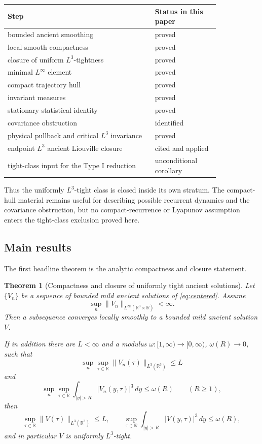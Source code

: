 \documentclass[11pt]{amsart}
\theoremstyle{plain}
\newtheorem{theorem}{Theorem}[section]
\theoremstyle{definition}
\theoremstyle{remark}
\numberwithin{equation}{section}
\newcommand{\R}{\mathbb R}
\begin{document}
\begin{center}
\small
\begin{tabular}{p{0.58\linewidth}p{0.25\linewidth}}
\hline
Step & Status in this paper\\
\hline
bounded ancient smoothing & proved\\
local smooth compactness & proved\\
closure of uniform \(L^3\)-tightness & proved\\
minimal \(L^\infty\) element & proved\\
compact trajectory hull & proved\\
invariant measures & proved\\
stationary statistical identity & proved\\
covariance obstruction & identified\\
physical pullback and critical \(L^3\) invariance & proved\\
endpoint \(L^3\) ancient Liouville closure & cited and applied\\
tight-class input for the Type I reduction & unconditional corollary\\
\hline
\end{tabular}
\end{center}

Thus the uniformly \(L^3\)-tight class is closed inside its own stratum.  The
compact-hull material remains useful for describing possible recurrent
dynamics and the covariance obstruction, but no compact-recurrence or
Lyapunov assumption enters the tight-class exclusion proved here.

\subsection{Main results}

The first headline theorem is the analytic compactness and closure statement.

\begin{theorem}[Compactness and closure of uniformly tight ancient solutions]
\label{thm:tight-compactness-intro}
Let \(\{V_n\}\) be a sequence of bounded mild ancient solutions of
\eqref{eq:centered}.  Assume
\[
   \sup_n\|V_n\|_{L^\infty(\R^3\times\R)}<\infty .
\]
Then a subsequence converges locally smoothly to a bounded mild ancient
solution \(V\).

If in addition there are \(L<\infty\) and a modulus
\(\omega:[1,\infty)\to[0,\infty)\), \(\omega(R)\to0\), such that
\[
   \sup_n\sup_{\tau\in\R}\|V_n(\tau)\|_{L^3(\R^3)}\le L
\]
and
\[
   \sup_n\sup_{\tau\in\R}
   \int_{|y|>R}|V_n(y,\tau)|^3\,dy\le \omega(R)
   \qquad (R\ge1),
\]
then
\[
   \sup_{\tau\in\R}\|V(\tau)\|_{L^3(\R^3)}\le L,
   \qquad
   \sup_{\tau\in\R}\int_{|y|>R}|V(y,\tau)|^3\,dy\le\omega(R),
\]
and in particular \(V\) is uniformly \(L^3\)-tight.
\end{theorem}
\end{document}
